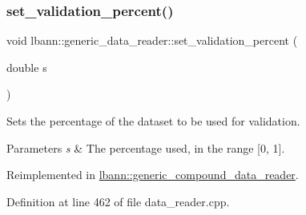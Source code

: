\subsubsection{\texorpdfstring{set\+\_\+validation\+\_\+percent()}{set\_validation\_percent()}}
{\footnotesize\ttfamily void lbann\+::generic\+\_\+data\+\_\+reader\+::set\+\_\+validation\+\_\+percent (\begin{DoxyParamCaption}\item[{double}]{s }\end{DoxyParamCaption})\hspace{0.3cm}{\ttfamily [virtual]}}

Sets the percentage of the dataset to be used for validation. 
\begin{DoxyParams}{Parameters}
{\em s} & The percentage used, in the range \mbox{[}0, 1\mbox{]}. \\
\hline
\end{DoxyParams}


Reimplemented in \hyperlink{classlbann_1_1generic__compound__data__reader_a6b8288801972561d9758337c61eb39b8}{lbann\+::generic\+\_\+compound\+\_\+data\+\_\+reader}.



Definition at line 462 of file data\+\_\+reader.\+cpp.


